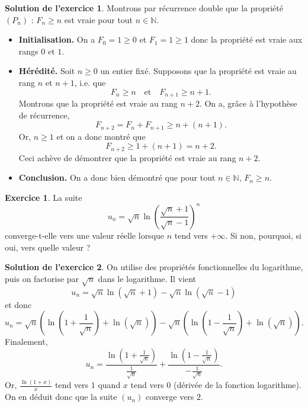\documentclass[a4paper, 11pt,openany]{article}%
\theoremstyle{plain}
\theoremstyle{definition}
\newtheorem{exo}{Exercice}
\newtheorem{sol}{Solution de l'exercice}
\theoremstyle{remark}
\newcommand{\N}{\mathbb{N}}
\begin{document}
\begin{sol}
Montrons par récurrence double que la propriété $(P_n)$ : $F_n \geqslant n$ est vraie pour tout $n \in \N$.
  \begin{itemize}
 \item \textbf{Initialisation.} On a $F_0= 1 \geqslant 0$ et  $F_1= 1\geqslant 1$ donc la propriété est vraie aux rangs $0$ et $1$.
 \item \textbf{Hérédité.} Soit $n \geqslant 0$ un entier fixé. Supposons que la propriété est vraie au rang $n$ et $n+1$, i.e. que \[ F_n \geqslant n \quad \text{et} \quad F_{n+1} \geqslant n+1.\]
 Montrons que la propriété est vraie au rang $n+2$. On a, grâce à l'hypothèse de récurrence,
 \[ F_{n+2} = F_n + F_{n+1} \geqslant n + (n+1).\]
 Or, $n\geqslant 1$ et on a donc montré que 
 \[ F_{n+2} \geqslant 1 + (n+1) = n+2.\]
 Ceci achève de démontrer que la propriété est vraie au rang $n+2$.
 \item \textbf{Conclusion.} On a donc bien démontré que pour tout $n \in \N$, $F_n \geqslant n$.
 \end{itemize}
\end{sol}

\begin{exo}
La suite 
\[ u_n= \sqrt{n} \ln \left(\frac{\sqrt{n} +1}{\sqrt{n}-1} \right)^n\]
converge-t-elle vers une valeur réelle lorsque $n$ tend vers $+\infty$. Si non, pourquoi, si oui, vers quelle valeur ?
\end{exo}

\begin{sol}
On utilise des propriétés fonctionnelles du logarithme, puis on factorise par $\sqrt{n}$ dans le logarithme. Il vient 
\[ u_n= \sqrt{n} \ln(\sqrt{n}+1)-\sqrt{n}\ln(\sqrt{n}-1)\]
et donc
\[ u_n= \sqrt{n} \left( \ln \left(1 + \frac{1}{\sqrt{n}} \right) + \ln(\sqrt{n}) \right)-\sqrt{n} \left( \ln \left(1 - \frac{1}{\sqrt{n}} \right) + \ln(\sqrt{n}) \right).\]
Finalement,
\[ u_n = \frac{\ln\left(1 + \frac{1}{\sqrt{n}} \right)}{\frac{1}{\sqrt{n}}} + \frac{\ln\left(1 - \frac{1}{\sqrt{n}} \right)}{-\frac{1}{\sqrt{n}}}.\]
Or, $\frac{\ln(1+x)}{x}$ tend vers $1$ quand $x$ tend vers $0$ (dérivée de la fonction logarithme). On en déduit donc que la suite $(u_n)$ converge vers $2$.
\end{sol}
\end{document}
